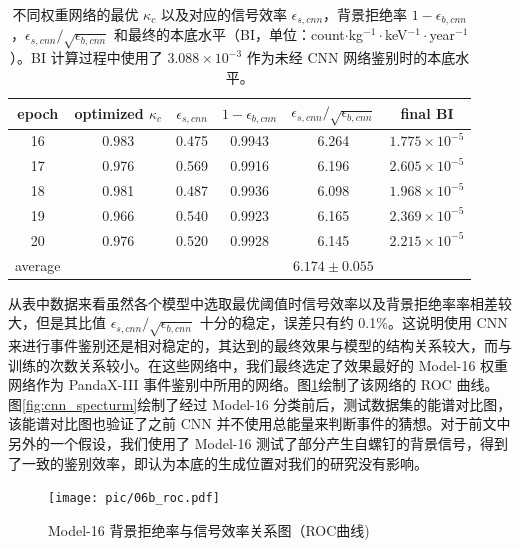 \begin{table}
    \centering
    \caption{不同权重网络的最优 $\kappa_c$ 以及对应的信号效率 $\epsilon_{s,cnn}$，背景拒绝率 $1-\epsilon_{b,cnn}$，$\epsilon_{s,cnn}/\sqrt{\epsilon_{b,cnn}}$ 和最终的本底水平（BI，单位：count$\cdot$kg$^{-1}\cdot$keV$^{-1}\cdot$year$^{-1}$）。BI 计算过程中使用了 $3.088\times10^{-3}$ \ckky 作为未经 CNN 网络鉴别时的本底水平。}
    \begin{tabular}{cccccc}
      \\\hline
      epoch & optimized $\kappa_c$ & $\epsilon_{s,cnn}$ & $ 1-\epsilon_{b,cnn}$ &$\epsilon_{s,cnn}/\sqrt{\epsilon_{b,cnn}}$ & final BI\\\hline
      16 & 0.983 & 0.475 & 0.9943 & 6.264 & $1.775\times10^{-5}$ \\
      17 & 0.976 & 0.569 & 0.9916 & 6.196 & $2.605\times10^{-5}$ \\
      18 & 0.981 & 0.487 & 0.9936 & 6.098 & $1.968\times10^{-5}$ \\
      19 & 0.966 & 0.540 & 0.9923 & 6.165 & $2.369\times10^{-5}$ \\
      20 & 0.976 & 0.520 & 0.9928 & 6.145 & $2.215\times10^{-5}$ \\\hline
      average &  &  &  & $6.174\pm0.055$ \\\hline
    \end{tabular}
    \label{tab:efficiencies}
  \end{table}
  
从表中数据来看虽然各个模型中选取最优阈值时信号效率以及背景拒绝率率相差较大，但是其比值 $\epsilon_{s,cnn}/\sqrt{\epsilon_{b,cnn}}$ 十分的稳定，误差只有约 0.1\%。这说明使用 CNN 来进行事件鉴别还是相对稳定的，其达到的最终效果与模型的结构关系较大，而与训练的次数关系较小。在这些网络中，我们最终选定了效果最好的 Model-16 权重网络作为 PandaX-III 事件鉴别中所用的网络。图\ref{fig:cnn_roc}绘制了该网络的 ROC 曲线。图\ref{fig:cnn_specturm}绘制了经过 Model-16 分类前后，测试数据集的能谱对比图，该能谱对比图也验证了之前 CNN 并不使用总能量来判断事件的猜想。对于前文中另外的一个假设，我们使用了 Model-16 测试了部分产生自螺钉的背景信号，得到了一致的鉴别效率，即认为本底的生成位置对我们的研究没有影响。

\begin{figure}
    \centering
    \texttt{[image: pic/06b\_roc.pdf]}
    \caption{Model-16 背景拒绝率与信号效率关系图（ROC曲线)}
    \label{fig:cnn_roc}
\end{figure}

